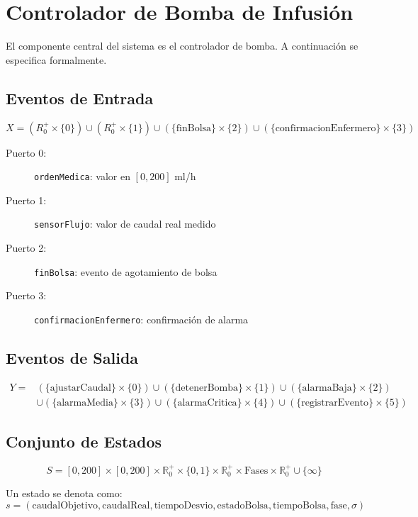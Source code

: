 \documentclass[12pt,a4paper,oneside]{report}
\begin{document}
\section{Controlador de Bomba de Infusión}

El componente central del sistema es el controlador de bomba. A continuación se especifica formalmente.

\subsection{Eventos de Entrada}

\[
X = (R^+_0 \times \{0\}) \cup (R^+_0 \times \{1\}) \cup (\{\text{finBolsa}\} \times \{2\}) \cup (\{\text{confirmacionEnfermero}\} \times \{3\})
\]

\begin{description}
    \item[Puerto 0:] \texttt{ordenMedica}: valor en $[0, 200]$ ml/h
    \item[Puerto 1:] \texttt{sensorFlujo}: valor de caudal real medido
    \item[Puerto 2:] \texttt{finBolsa}: evento de agotamiento de bolsa
    \item[Puerto 3:] \texttt{confirmacionEnfermero}: confirmación de alarma
\end{description}

\subsection{Eventos de Salida}

\[
\begin{aligned}
Y = &(\{\text{ajustarCaudal}\} \times \{0\})
\cup (\{\text{detenerBomba}\} \times \{1\})
\cup (\{\text{alarmaBaja}\} \times \{2\}) \\
&\cup (\{\text{alarmaMedia}\} \times \{3\})
\cup (\{\text{alarmaCritica}\} \times \{4\})
\cup (\{\text{registrarEvento}\} \times \{5\})
\end{aligned}
\]

\subsection{Conjunto de Estados}

\[
S = [0, 200] \times [0, 200] \times \mathbb{R}^+_0 \times \{0, 1\} \times \mathbb{R}^+_0 \times \text{Fases} \times \mathbb{R}^+_0 \cup \{\infty\}
\]

Un estado se denota como:
\[
s = (\text{caudalObjetivo}, \text{caudalReal}, \text{tiempoDesvio}, \text{estadoBolsa}, \text{tiempoBolsa}, \text{fase}, \sigma)
\]
\end{document}
